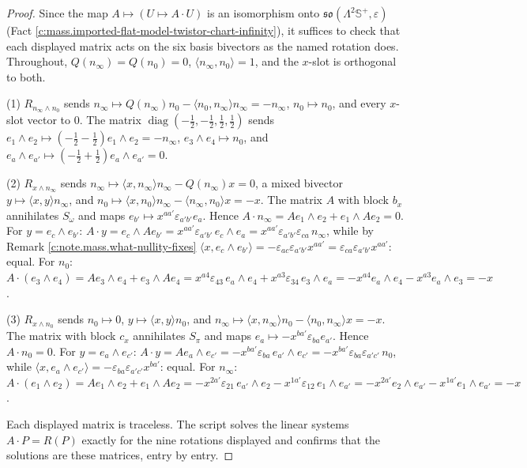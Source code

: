 \documentclass[11pt]{article}
\theoremstyle{definition}
\theoremstyle{plain}
\providecommand{\CS}{}\renewcommand{\CS}{{\mathbb{S}^{+}}}
\providecommand{\Som}{}\renewcommand{\Som}{S_\omega}
\providecommand{\Spi}{}\renewcommand{\Spi}{S_\pi}
\providecommand{\ip}{}\renewcommand{\ip}[2]{\langle #1, #2\rangle}
\begin{document}
\begin{proof}
Since the map $A \mapsto (U \mapsto A\cdot U)$ is an isomorphism onto $\mathfrak{so}(\Lambda^{2}\CS,\varepsilon)$ (Fact \ref{c:mass.imported-flat-model-twistor-chart-infinity}), it suffices to check that each displayed matrix acts on the six basis bivectors as the named rotation does. Throughout, $Q(n_{\infty}) = Q(n_{0}) = 0$, $\ip{n_{\infty}}{n_{0}} = 1$, and the $x$-slot is orthogonal to both.

(1) $R_{n_{\infty}\wedge n_{0}}$ sends $n_{\infty} \mapsto Q(n_{\infty})n_{0} - \ip{n_{0}}{n_{\infty}}n_{\infty} = -n_{\infty}$, $n_{0} \mapsto n_{0}$, and every $x$-slot vector to $0$. The matrix $\operatorname{diag}(-\tfrac12,-\tfrac12,\tfrac12,\tfrac12)$ sends $e_{1}\wedge e_{2} \mapsto (-\tfrac12 - \tfrac12)e_{1}\wedge e_{2} = -n_{\infty}$, $e_{3}\wedge e_{4} \mapsto n_{0}$, and $e_{a}\wedge e_{a'} \mapsto (-\tfrac12 + \tfrac12)e_{a}\wedge e_{a'} = 0$.

(2) $R_{x\wedge n_{\infty}}$ sends $n_{\infty} \mapsto \ip{x}{n_{\infty}}n_{\infty} - Q(n_{\infty})x = 0$, a mixed bivector $y \mapsto \ip{x}{y}n_{\infty}$, and $n_{0} \mapsto \ip{x}{n_{0}}n_{\infty} - \ip{n_{\infty}}{n_{0}}x = -x$. The matrix $A$ with block $b_{x}$ annihilates $\Som$ and maps $e_{b'} \mapsto x^{aa'}\varepsilon_{a'b'}e_{a}$. Hence $A\cdot n_{\infty} = Ae_{1}\wedge e_{2} + e_{1}\wedge Ae_{2} = 0$. For $y = e_{c}\wedge e_{b'}$: $A\cdot y = e_{c}\wedge Ae_{b'} = x^{aa'}\varepsilon_{a'b'}\,e_{c}\wedge e_{a} = x^{aa'}\varepsilon_{a'b'}\varepsilon_{ca}\,n_{\infty}$, while by Remark \ref{c:note.mass.what-nullity-fixes} $\ip{x}{e_{c}\wedge e_{b'}} = -\varepsilon_{ac}\varepsilon_{a'b'}x^{aa'} = \varepsilon_{ca}\varepsilon_{a'b'}x^{aa'}$: equal. For $n_{0}$: $A\cdot(e_{3}\wedge e_{4}) = Ae_{3}\wedge e_{4} + e_{3}\wedge Ae_{4} = x^{a4}\varepsilon_{43}\,e_{a}\wedge e_{4} + x^{a3}\varepsilon_{34}\,e_{3}\wedge e_{a} = -x^{a4}e_{a}\wedge e_{4} - x^{a3}e_{a}\wedge e_{3} = -x$.

(3) $R_{x\wedge n_{0}}$ sends $n_{0} \mapsto 0$, $y \mapsto \ip{x}{y}n_{0}$, and $n_{\infty} \mapsto \ip{x}{n_{\infty}}n_{0} - \ip{n_{0}}{n_{\infty}}x = -x$. The matrix with block $c_{x}$ annihilates $\Spi$ and maps $e_{a} \mapsto -x^{ba'}\varepsilon_{ba}e_{a'}$. Hence $A\cdot n_{0} = 0$. For $y = e_{a}\wedge e_{c'}$: $A\cdot y = Ae_{a}\wedge e_{c'} = -x^{ba'}\varepsilon_{ba}\,e_{a'}\wedge e_{c'} = -x^{ba'}\varepsilon_{ba}\varepsilon_{a'c'}\,n_{0}$, while $\ip{x}{e_{a}\wedge e_{c'}} = -\varepsilon_{ba}\varepsilon_{a'c'}x^{ba'}$: equal. For $n_{\infty}$: $A\cdot(e_{1}\wedge e_{2}) = Ae_{1}\wedge e_{2} + e_{1}\wedge Ae_{2} = -x^{2a'}\varepsilon_{21}\,e_{a'}\wedge e_{2} - x^{1a'}\varepsilon_{12}\,e_{1}\wedge e_{a'} = -x^{2a'}e_{2}\wedge e_{a'} - x^{1a'}e_{1}\wedge e_{a'} = -x$.

Each displayed matrix is traceless. The script solves the linear systems $A\cdot P = R(P)$ exactly for the nine rotations displayed and confirms that the solutions are these matrices, entry by entry.

\end{proof}
\end{document}
